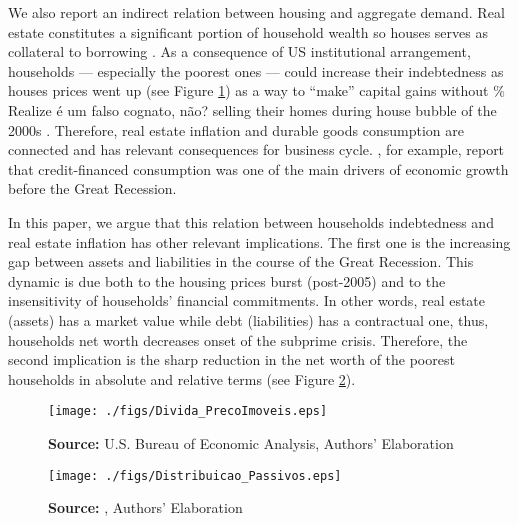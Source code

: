 \documentclass[11pt]{article}
\begin{document}
We also report an indirect relation between housing and aggregate demand. 
Real estate constitutes a significant portion of household wealth so houses serves as collateral to borrowing \cite{teixeira_uma_2011}. 
As a consequence of US institutional arrangement, households --- especially the poorest ones --- could increase their indebtedness as houses prices went up (see Figure \ref{FigDividaPreco}) as a way to ``make'' capital gains without \% Realize é um falso cognato, não?
selling their homes during house bubble of the 2000s \cite{teixeira_crescimento_2015}.
Therefore, real estate inflation and durable goods consumption are connected and has relevant consequences for business cycle.
\textcites{zezza_u.s._2008}{barba_rising_2009}, for example, report that credit-financed consumption was one of the main drivers of economic growth before the Great Recession.


In this paper, we argue that this relation between households indebtedness and real estate inflation has other relevant implications.
The first one is the increasing gap between assets and liabilities in the course of the Great Recession.
This dynamic is due both to the housing prices burst (post-2005) and to the insensitivity of households' financial commitments.
In other words, real estate (assets) has a market value while debt (liabilities) has a contractual one, thus, households net worth decreases onset of the subprime crisis.
Therefore, the second implication is the sharp reduction in the net worth of the poorest households in absolute and relative terms (see Figure \ref{FigDistPassivos}).

\begin{figure}[H]
	\centering
	\caption{Household indebtedness and house prices dynamics (jan/2000=100)}
	\label{FigDividaPreco}
	\texttt{[image: ./figs/Divida\_PrecoImoveis.eps]}
	\caption*{\textbf{Source:} U.S. Bureau of Economic Analysis, Authors' Elaboration}
\end{figure}

\begin{figure}[H]
	\centering
	\caption{Liabilities evolution by wealth percentile (1989/07=1)}
	\label{FigDistPassivos}
	\texttt{[image: ./figs/Distribuicao\_Passivos.eps]}
	\caption*{\textbf{Source:} \textcite{us_census_bureau_characteristics_2017}, Authors' Elaboration}
\end{figure}
\end{document}
